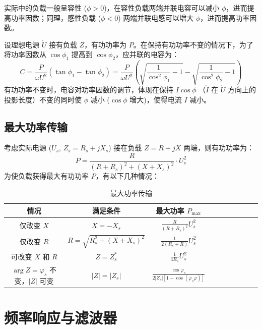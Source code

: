 \documentclass[UTF8]{report}
\theoremstyle{MyLineTheoremStyle} %
\theoremstyle{MyBlockTheoremStyle} %
\theoremstyle{MySubsubsectionStyle} %
\begin{document}
实际中的负载一般呈容性 ($\phi > 0$)，在容性负载两端并联电容可以减小 $\phi$，进而提高功率因数；同理，感性负载 ($\phi < 0$) 两端并联电感可以增大 $\phi$，进而提高功率因数。

设理想电源 $\dot{U}$ 接有负载 $Z$，有功功率为 $P$。在保持有功功率不变的情况下，为了将功率因数从 $\cos \phi_1$ 提高到 $\cos \phi_2$，应并联的电容为：
\begin{equation}
C = \frac{P}{\omega U^2} \left( \tan \phi_1 - \tan \phi_2 \right) = 
\frac{P}{\omega U^2} \left( \sqrt{\frac{1}{\cos^2 \phi_1} - 1} - \sqrt{\frac{1}{\cos^2 \phi_2} - 1} \right)
\end{equation}
有功功率不变时，电容对功率因数的调节，体现在保持 $I \cos \phi$ （$\dot{I}$ 在 $\dot{U}$ 方向上的投影长度）不变的同时使 $\phi$ 减小 ($\cos \phi$ 增大)，使得电流 $I$ 减小。


\subsection{最大功率传输}

考虑实际电源 ($\dot{U_s}$, $Z_s = R_s + j X_s$) 接在负载 $Z = R + jX$ 两端，则有功功率为：
\begin{equation}
P = \frac{R}{(R + R_s)^2 + (X + X_s)^2} \cdot U_s^2 
\end{equation}
为使负载获得最大有功功率 $P$，有以下几种情况：
\begin{table}[H]\centering
    \renewcommand{\arraystretch}{1.5} %
    \caption{最大功率传输}
    \label{最大功率传输}
\begin{tabular}{cccccccccc}\toprule
    情况 & 满足条件 & 最大功率 $P_{\max}$  \\
    \midrule
    仅改变 $X$ & $X = -X_s$ & $\displaystyle \frac{R}{(R+R_s)^2} U_s^2$  \\
    仅改变 $R$ & $R = \sqrt{R_s^2 + (X + X_s)^2}$ & $\displaystyle \frac{1}{2(R_s + R)} U_s^2$  \\
    可改变 $X$ 和 $R$ & $Z = Z_s^*$ & $\displaystyle \frac{1}{4R_s} U_s^2$  \\
    $\arg Z = \varphi_s$ 不变，$| Z |$ 可变 & $| Z | = | Z_s |$ & $\displaystyle \frac{\cos \varphi_s}{2 | Z_s | \left[ 1 - \cos (\varphi_s \varphi) \right]}$   \\
    \bottomrule
\end{tabular}
\end{table}

\section{频率响应与滤波器}
\end{document}
